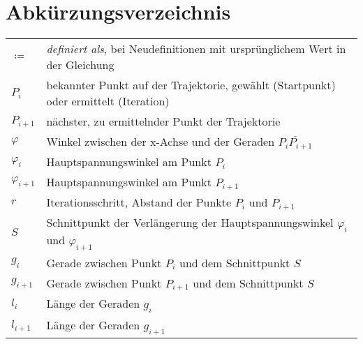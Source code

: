 
\section*{Abkürzungsverzeichnis}
{\small \begin{tabular}[t]{ll}
	$\coloneqq$ & \textit{definiert als}, bei Neudefinitionen mit ursprünglichem Wert in der Gleichung\\
	$P_{i}$ & bekannter Punkt auf der Trajektorie, gewählt (Startpunkt) oder ermittelt (Iteration)\\
	$P_{i+1}$ & nächster, zu ermittelnder Punkt der Trajektorie\\
	$\varphi$ & Winkel zwischen der x-Achse und der Geraden $\overline{P_{i}P_{i+1}}$\\
	$\varphi_{i}$ & Hauptspannungswinkel am Punkt $P_{i}$ \\
	$\varphi_{i+1}$ & Hauptspannungswinkel am Punkt $P_{i+1}$ \\
	$r$ & Iterationsschritt, Abstand der Punkte $P_{i}$ und $P_{i+1}$\\
	$S$ & Schnittpunkt der Verlängerung der Hauptspannungswinkel $\varphi_{i}$ und $\varphi_{i+1}$\\
	$g_{i}$ & Gerade zwischen Punkt $P_{i}$ und dem Schnittpunkt $S$ \\
	$g_{i+1}$ & Gerade zwischen Punkt $P_{i+1}$ und dem Schnittpunkt $S$ \\
	$l_{i}$ & Länge der Geraden $g_{i}$\\
	$l_{i+1}$ & Länge der Geraden $g_{i+1}$\\
\end{tabular}}
\clearpage
\ohead[]{\parbox[t][5mm]{\textwidth}{\raggedleft \rightmark}}